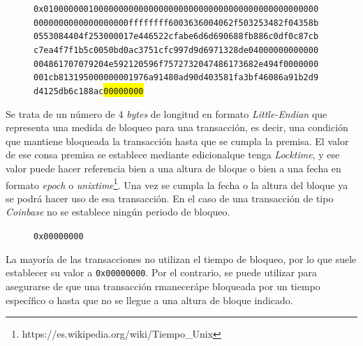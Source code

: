 \documentclass{article}
\begin{document}
    \begin{figure}[H]
        \texttt{0x0100000001000000000000000000000000000000000000000000000} \\
        \texttt{0000000000000000000ffffffff6003636004062f503253482f04358b} \\
        \texttt{0553084404f253000017e446522cfabe6d6d690688fb886c0df0c87cb} \\
        \texttt{c7ea4f7f1b5c0050bd0ac3751cfc997d9d6971328de04000000000000} \\
        \texttt{004861707079204e592120596f7572732047486173682e494f0000000} \\
        \texttt{001cb813195000000001976a91480ad90d403581fa3bf46086a91b2d9} \\
        \texttt{d4125db6c188ac\colorbox{Yellow}{00000000}}
    \end{figure}
    
    Se trata de un número de 4 \textit{bytes} de longitud en formato \textit{Little-Endian} que representa una medida de bloqueo para una transacción, es decir, una condición que mantiene bloqueada la transacción hasta que se cumpla la premisa. El valor  de ese consa premisa se establece mediante edicionalque tenga \textit{Locktime}, y ese valor puede hacer referencia bien a una altura de bloque o bien a una fecha en formato \textit{epoch} o \textit{unixtime}\footnote{https://es.wikipedia.org/wiki/Tiempo\_Unix}. Una vez se cumpla la fecha o la altura del bloque ya se podrá hacer uso de esa transacción. En el caso de una transacción de tipo \textit{Coinbase} no se establece ningún periodo de bloqueo.
    \begin{figure}[H]
        \texttt{0x00000000}
    \end{figure}
    
    La mayoría de las transacciones no utilizan el tiempo de bloqueo, por lo que suele establecer su valor a \texttt{0x00000000}. Por el contrario, se puede utilizar para asegurarse de que una transacción rmanecerápe bloqueada por un tiempo específico o hasta que no se llegue a una altura de bloque indicado.
    
\end{document}
